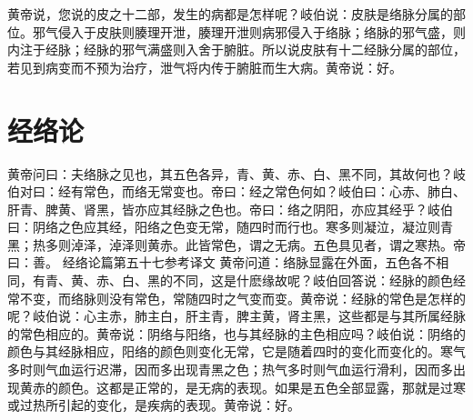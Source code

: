 \documentclass[a4paper,12pt,UTF8,twoside]{ctexbook}
\begin{document}
黄帝说，您说的皮之十二部，发生的病都是怎样呢？岐伯说：皮肤是络脉分属的部位。邪气侵入于皮肤则腠理开泄，腠理开泄则病邪侵入于络脉；络脉的邪气盛，则内注于经脉；经脉的邪气满盛则入舍于腑脏。所以说皮肤有十二经脉分属的部位，若见到病变而不预为治疗，泄气将内传于腑脏而生大病。黄帝说：好。
\chapter{经络论}
黄帝问曰：夫络脉之见也，其五色各异，青、黄、赤、白、黑不同，其故何也？岐伯对曰：经有常色，而络无常变也。帝曰：经之常色何如？岐伯曰：心赤、肺白、肝青、脾黄、肾黑，皆亦应其经脉之色也。帝曰：络之阴阳，亦应其经乎？岐伯曰：阴络之色应其经，阳络之色变无常，随四时而行也。寒多则凝泣，凝泣则青黑；热多则淖泽，淖泽则黄赤。此皆常色，谓之无病。五色具见者，谓之寒热。帝曰：善。
经络论篇第五十七参考译文
黄帝问道：络脉显露在外面，五色各不相同，有青、黄、赤、白、黑的不同，这是什麽缘故呢？岐伯回答说：经脉的颜色经常不变，而络脉则没有常色，常随四时之气变而变。黄帝说：经脉的常色是怎样的呢？岐伯说：心主赤，肺主白，肝主青，脾主黄，肾主黑，这些都是与其所属经脉的常色相应的。黄帝说：阴络与阳络，也与其经脉的主色相应吗？岐伯说：阴络的颜色与其经脉相应，阳络的颜色则变化无常，它是随着四时的变化而变化的。寒气多时则气血运行迟滞，因而多出现青黑之色；热气多时则气血运行滑利，因而多出现黄赤的颜色。这都是正常的，是无病的表现。如果是五色全部显露，那就是过寒或过热所引起的变化，是疾病的表现。黄帝说：好。
\end{document}
